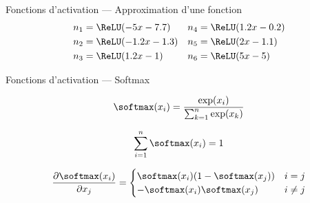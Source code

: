 \begin{frame}{Fonctions d'activation --- Approximation d'une fonction}
  \centering
  {\small
    \begin{align*}
      n_1 & = \ReLU(-5x - 7.7) & n_4 & = \ReLU(1.2x - 0.2) \\
      n_2 & = \ReLU(-1.2x - 1.3) & n_5 & = \ReLU(2x - 1.1) \\
      n_3 & = \ReLU(1.2x - 1) & n_6 & = \ReLU(5x - 5) \\
    \end{align*}
  }
\end{frame}

\begin{frame}{Fonctions d'activation --- Softmax}
  \begin{description}[<+->]
    \item[Définition] \[\softmax(x_i) = \frac{\exp(x_i)}{\sum_{k = 1}^n{\exp(x_k)}}\]
    \item[Propriété] \[\sum_{i = 1}^n{\softmax(x_i)} = 1\]
    \item[Gradient] \[
      \frac{\partial \softmax(x_i)}{\partial x_j} =
        \begin{cases}
          \softmax(x_i)(1 - \softmax(x_j)) & i = j \\
          -\softmax(x_i)\softmax(x_j) & i \neq j
        \end{cases}
      \]
  \end{description}
\end{frame}
